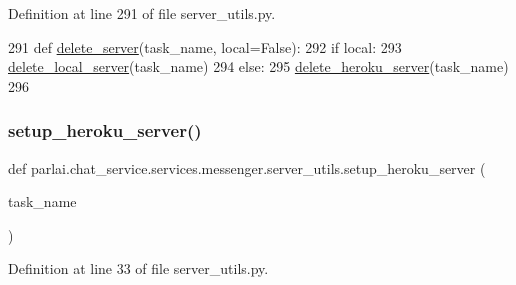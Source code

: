 Definition at line 291 of file server\+\_\+utils.\+py.


\begin{DoxyCode}
291 \textcolor{keyword}{def }\hyperlink{namespaceparlai_1_1mturk_1_1core_1_1server__utils_a3c7c1d82bd4d26eb98ce9711de3cca7c}{delete\_server}(task\_name, local=False):
292     \textcolor{keywordflow}{if} local:
293         \hyperlink{namespaceparlai_1_1mturk_1_1core_1_1server__utils_a9b4f4c3f696be001c2fa96b3690af83c}{delete\_local\_server}(task\_name)
294     \textcolor{keywordflow}{else}:
295         \hyperlink{namespaceparlai_1_1mturk_1_1core_1_1server__utils_a8dfde882f9d6ff492ca565ae2334fc70}{delete\_heroku\_server}(task\_name)
296 \end{DoxyCode}
\mbox{\label{namespaceparlai_1_1chat__service_1_1services_1_1messenger_1_1server__utils_ad6686d06420159711f730caba7e82964}} 
\subsubsection{\texorpdfstring{setup\+\_\+heroku\+\_\+server()}{setup\_heroku\_server()}}
{\footnotesize\ttfamily def parlai.\+chat\+\_\+service.\+services.\+messenger.\+server\+\_\+utils.\+setup\+\_\+heroku\+\_\+server (\begin{DoxyParamCaption}\item[{}]{task\+\_\+name }\end{DoxyParamCaption})}



Definition at line 33 of file server\+\_\+utils.\+py.


